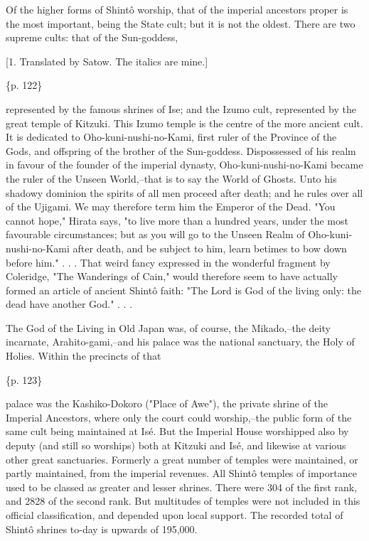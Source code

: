 Of the higher forms of Shintô worship, that of the imperial ancestors proper is the most important, being the State cult; but it is not the oldest. There are two supreme cults: that of the Sun-goddess,

[1. Translated by Satow. The italics are mine.]

\{p. 122\}

represented by the famous shrines of Ise; and the Izumo cult, represented by the great temple of Kitzuki. This Izumo temple is the centre of the more ancient cult. It is dedicated to Oho-kuni-nushi-no-Kami, first ruler of the Province of the Gods, and offspring of the brother of the Sun-goddess. Dispossessed of his realm in favour of the founder of the imperial dynasty, Oho-kuni-nushi-no-Kami became the ruler of the Unseen World,--that is to say the World of Ghosts. Unto his shadowy dominion the spirits of all men proceed after death; and he rules over all of the Ujigami. We may therefore term him the Emperor of the Dead. "You cannot hope," Hirata says, "to live more than a hundred years, under the most favourable circumstances; but as you will go to the Unseen Realm of Oho-kuni-nushi-no-Kami after death, and be subject to him, learn betimes to bow down before him." . . . That weird fancy expressed in the wonderful fragment by Coleridge, "The Wanderings of Cain," would therefore seem to have actually formed an article of ancient Shintô faith: "The Lord is God of the living only: the dead have another God." . . .



The God of the Living in Old Japan was, of course, the Mikado,--the deity incarnate, Arahito-gami,--and his palace was the national sanctuary, the Holy of Holies. Within the precincts of that

\{p. 123\}

palace was the Kashiko-Dokoro ("Place of Awe"), the private shrine of the Imperial Ancestors, where only the court could worship,--the public form of the same cult being maintained at Isé. But the Imperial House worshipped also by deputy (and still so worships) both at Kitzuki and Isé, and likewise at various other great sanctuaries. Formerly a great number of temples were maintained, or partly maintained, from the imperial revenues. All Shintô temples of importance used to be classed as greater and lesser shrines. There were 304 of the first rank, and 2828 of the second rank. But multitudes of temples were not included in this official classification, and depended upon local support. The recorded total of Shintô shrines to-day is upwards of 195,000.



